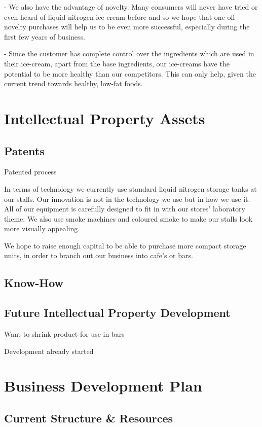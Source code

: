 \documentclass{article}
\begin{document}
 - We also have the advantage of novelty. Many consumers will never
have tried or even heard of liquid nitrogen ice-cream before and so
we hope that one-off novelty purchases will help us to be even more
successful, especially during the first few years of business.

 - Since the customer has complete control over the ingredients which are used in their ice-cream, apart from the base ingredients, our ice-creams have the potential to be more healthy than our competitors. This can only help, given the current trend towards healthy, low-fat foods.

\section{Intellectual Property Assets}

  \subsection{Patents}
    Patented process

In terms of technology we currently use standard liquid nitrogen storage tanks at our stalls. Our innovation is not in the technology we use but in how we use it. All of our equipment is carefully designed to fit in with our stores' laboratory theme. We also use smoke machines and coloured smoke to make our stalls look more visually appealing.

We hope to raise enough capital to be able to purchase more compact storage units, in order to branch out our business into cafe's or bars.

  \subsection{Know-How}

  \subsection{Future Intellectual Property Development}

  Want to shrink product for use in bars

  Development already started

\section{Business Development Plan}

  \subsection{Current Structure \& Resources}
\end{document}
